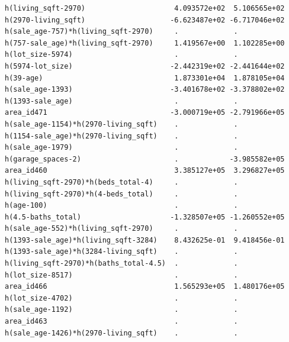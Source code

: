 \documentclass[
]{article}
\begin{document}
\begin{verbatim}
h(living_sqft-2970)                     4.093572e+02  5.106565e+02
h(2970-living_sqft)                    -6.623487e+02 -6.717046e+02
h(sale_age-757)*h(living_sqft-2970)     .             .           
h(757-sale_age)*h(living_sqft-2970)     1.419567e+00  1.102285e+00
h(lot_size-5974)                        .             .           
h(5974-lot_size)                       -2.442319e+02 -2.441644e+02
h(39-age)                               1.873301e+04  1.878105e+04
h(sale_age-1393)                       -3.401678e+02 -3.378802e+02
h(1393-sale_age)                        .             .           
area_id471                             -3.000719e+05 -2.791966e+05
h(sale_age-1154)*h(2970-living_sqft)    .             .           
h(1154-sale_age)*h(2970-living_sqft)    .             .           
h(sale_age-1979)                        .             .           
h(garage_spaces-2)                      .            -3.985582e+05
area_id460                              3.385127e+05  3.296827e+05
h(living_sqft-2970)*h(beds_total-4)     .             .           
h(living_sqft-2970)*h(4-beds_total)     .             .           
h(age-100)                              .             .           
h(4.5-baths_total)                     -1.328507e+05 -1.260552e+05
h(sale_age-552)*h(living_sqft-2970)     .             .           
h(1393-sale_age)*h(living_sqft-3284)    8.432625e-01  9.418456e-01
h(1393-sale_age)*h(3284-living_sqft)    .             .           
h(living_sqft-2970)*h(baths_total-4.5)  .             .           
h(lot_size-8517)                        .             .           
area_id466                              1.565293e+05  1.480176e+05
h(lot_size-4702)                        .             .           
h(sale_age-1192)                        .             .           
area_id463                              .             .           
h(sale_age-1426)*h(2970-living_sqft)    .             .           
                                                                  

\end{verbatim}
\end{document}
